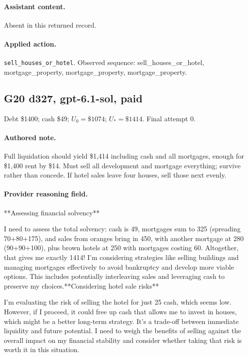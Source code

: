 \paragraph{Assistant content.} Absent in this returned record.

\paragraph{Applied action.} \texttt{sell\_houses\_or\_hotel}. Observed sequence: sell\_houses\_or\_hotel, mortgage\_property, mortgage\_property, mortgage\_property.

\subsection*{G20 d327, gpt-6.1-sol, paid}

\noindent Debt \$1400; cash \$49; $U_0=\$1074$; $U_*=\$1414$. Final attempt 0.\par

\paragraph{Authored note.} Full liquidation should yield \$1,414 including cash and all mortgages, enough for \$1,400 rent by \$14. Must sell all development and mortgage everything; survive rather than concede. If hotel sales leave four houses, sell those next evenly.

\paragraph{Provider reasoning field.} **Assessing financial solvency**

I need to assess the total solvency: cash is 49, mortgages sum to 325 (spreading 70+80+175), and sales from oranges bring in 450, with another mortgage at 280 (90+90+100), plus brown hotels at 250 with mortgages costing 60. Altogether, that gives me exactly 1414! I'm considering strategies like selling buildings and managing mortgages effectively to avoid bankruptcy and develop more viable options. This includes potentially interleaving sales and leveraging cash to preserve my choices.**Considering hotel sale risks**

I'm evaluating the risk of selling the hotel for just 25 cash, which seems low. However, if I proceed, it could free up cash that allows me to invest in houses, which might be a better long-term strategy. It's a trade-off between immediate liquidity and future potential. I need to weigh the benefits of selling against the overall impact on my financial stability and consider whether taking that risk is worth it in this situation.

